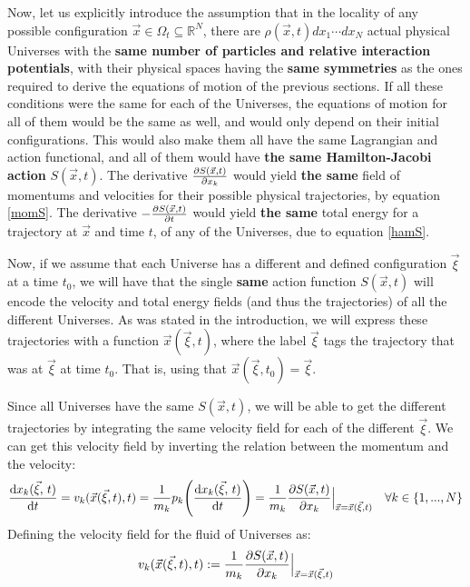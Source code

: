 \documentclass[11pt, a4paper]{article} %
\newcommand{\R}{\mathbb{R}} %
\begin{document}
Now, let us explicitly introduce the assumption that in the locality of any possible configuration $\vec{x}\in\Omega_t\subseteq\R^N$, there are $\rho(\vec{x},t)dx_1\cdots dx_N$ actual physical Universes with the {\bf same number of particles and relative interaction potentials}, with their physical spaces having the {\bf same symmetries} as the ones required to derive the equations of motion of the previous sections. If all these conditions were the same for each of the Universes, the equations of motion for all of them would be the same as well, and would only depend on their initial configurations. This would also make them all have the same Lagrangian and action functional, and all of them would have {\bf the same Hamilton-Jacobi action} $S(\vec{x},t)$. The derivative $\pdv{S(\vec{x},t)}{x_k}$ would yield {\bf the same} field of momentums and velocities for their possible physical trajectories, by equation \eqref{momS}. The derivative $-\pdv{S(\vec{x},t)}{t}$ would yield {\bf the same} total energy for a trajectory at $\vec{x}$ and time $t$, of any of the Universes, due to equation \eqref{hamS}.

Now, if we assume that each Universe has a different and defined configuration $\vec{\xi}$ at a time $t_0$, we will have that the single {\bf same} action function $S(\vec{x},t)$ will encode the velocity and total energy fields (and thus the trajectories) of all the different Universes. As was stated in the introduction, we will express these trajectories with a function $\vec{x}(\vec{\xi},t)$, where the label $\vec{\xi}$ tags the trajectory that was at $\vec{\xi}$ at time $t_0$. That is, using that $\vec{x}(\vec{\xi},t_0)=\vec{\xi}$. 

Since all Universes have the same $S(\vec{x},t)$, we will be able to get the different trajectories by integrating the same velocity field for each of the different $\vec{\xi}$. We can get this velocity field by inverting the relation between the momentum and the velocity:
\begin{equation}\label{GL}
\dv{x_k(\vec{\xi},\,t )}{t} =v_k(\vec{x}(\vec{\xi},t),t)=\frac{1}{m_k}p_k\qty(\dv{x_k(\vec{\xi},\,t )}{t})= \frac{1}{m_k} \pdv{S(\vec{x},t)}{x_k}\Big\rvert_{\vec{x}=\vec{x}( \vec{\xi},t)}\quad \forall k\in\{1,...,N\}
\end{equation}
Defining the velocity field for the fluid of Universes as:
\begin{equation}\label{v}
v_k(\vec{x}(\vec{\xi},t),t):= \frac{1}{m_k} \pdv{S(\vec{x},t)}{x_k}\Big\rvert_{\vec{x}=\vec{x}( \vec{\xi},t)}
\end{equation}
\end{document}
